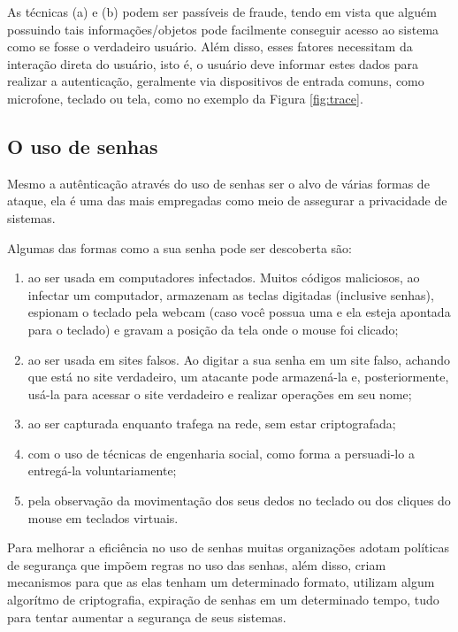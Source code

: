 As técnicas (a) e (b) podem ser passíveis de fraude, tendo em vista que alguém possuindo tais informações/objetos pode facilmente conseguir acesso ao sistema como se fosse o verdadeiro usuário. Além disso, esses fatores necessitam da interação direta do usuário, isto é, o usuário deve informar estes dados para realizar a autenticação, geralmente via dispositivos de entrada comuns, como microfone, teclado ou tela, como no exemplo da Figura \ref{fig:trace}.

\subsection{O uso de senhas}
Mesmo a autênticação através do uso de senhas ser o alvo de várias formas de ataque, ela é uma das mais empregadas como meio de assegurar a privacidade de sistemas.
\begin{citacao}
Algumas das formas como a sua senha pode ser descoberta são:
	\begin{footnotesize}
		\begin{enumerate}
		\item ao ser usada em computadores infectados. Muitos códigos maliciosos, ao infectar um computador, armazenam as teclas digitadas (inclusive senhas), espionam o teclado pela webcam (caso você possua uma e ela esteja apontada para o teclado) e gravam a posição da tela onde o mouse foi clicado;
		\item ao ser usada em sites falsos. Ao digitar a sua senha em um site falso, achando que está no site verdadeiro, um atacante pode armazená-la e, posteriormente, usá-la para acessar o site verdadeiro e realizar operações em seu nome;
		\item ao ser capturada enquanto trafega na rede, sem estar criptografada;
		\item com o uso de técnicas de engenharia social, como forma a persuadi-lo a entregá-la voluntariamente;
		\item pela observação da movimentação dos seus dedos no teclado ou dos cliques do mouse em teclados virtuais.
		\cite{Cert2016}
		\end{enumerate}
	\end{footnotesize}
\end{citacao}

Para melhorar a eficiência no uso de senhas muitas organizações adotam políticas de segurança que impõem regras no uso das senhas, além disso, criam mecanismos para que as elas tenham um determinado formato, utilizam algum algorítmo de criptografia, expiração de senhas em um determinado tempo, tudo para tentar aumentar a segurança de seus sistemas.

